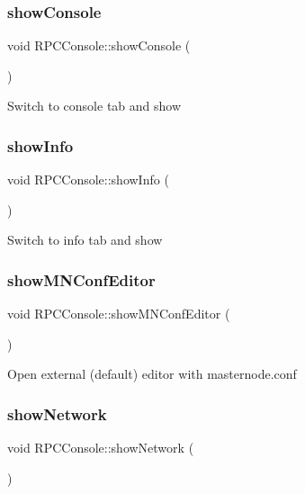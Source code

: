 \subsubsection{\texorpdfstring{showConsole}{showConsole}}
{\footnotesize\ttfamily void R\+P\+C\+Console\+::show\+Console (\begin{DoxyParamCaption}{ }\end{DoxyParamCaption})\hspace{0.3cm}{\ttfamily [slot]}}

Switch to console tab and show \mbox{\label{class_r_p_c_console_ae1a4c0c082f7eb5987164bca92b229f6}} 
\subsubsection{\texorpdfstring{showInfo}{showInfo}}
{\footnotesize\ttfamily void R\+P\+C\+Console\+::show\+Info (\begin{DoxyParamCaption}{ }\end{DoxyParamCaption})\hspace{0.3cm}{\ttfamily [slot]}}

Switch to info tab and show \mbox{\label{class_r_p_c_console_a8adc9441d40b37a037ecdfe8183323f7}} 
\subsubsection{\texorpdfstring{showMNConfEditor}{showMNConfEditor}}
{\footnotesize\ttfamily void R\+P\+C\+Console\+::show\+M\+N\+Conf\+Editor (\begin{DoxyParamCaption}{ }\end{DoxyParamCaption})\hspace{0.3cm}{\ttfamily [slot]}}

Open external (default) editor with masternode.\+conf \mbox{\label{class_r_p_c_console_afe2663c553d81da68b7df5022f65be4a}} 
\subsubsection{\texorpdfstring{showNetwork}{showNetwork}}
{\footnotesize\ttfamily void R\+P\+C\+Console\+::show\+Network (\begin{DoxyParamCaption}{ }\end{DoxyParamCaption})\hspace{0.3cm}{\ttfamily [slot]}}


